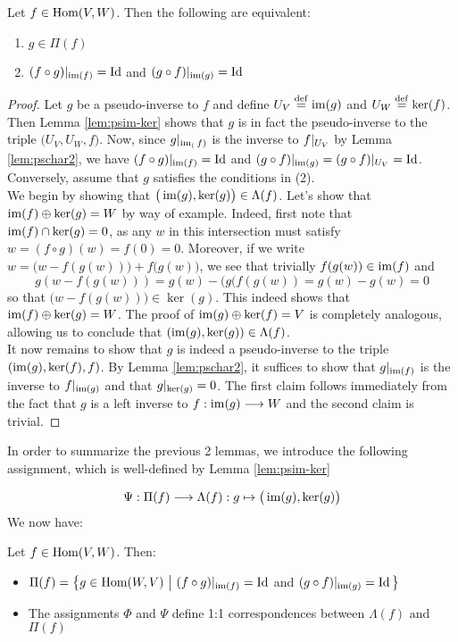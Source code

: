 \begin{lemma}\label{lem:charpi}
	Let $f \in \operatorname{Hom}(V,W)$. Then the following are equivalent:
	\begin{enumerate}
	\item $g \in \Pi(f)$
	\item $(f\circ g)\arrowvert_{\operatorname{im}(f)}=\operatorname{Id}$ and $(g\circ f)\arrowvert_{\operatorname{im}(g)}=\operatorname{Id}$ 
	\end{enumerate}
\end{lemma}

\begin{proof}
	Let $g$ be a pseudo-inverse to $f$ and define $U_V\stackrel{\operatorname{def}}{=}\operatorname{im}(g)$ and $U_W\stackrel{\operatorname{def}}{=}\ker(f)$. Then Lemma \ref{lem:psim-ker} shows that $g$ is in fact the pseudo-inverse to the triple $\big(U_V,U_W,f\big)$. Now, since $g\arrowvert_{\operatorname{im}_(f)}$ is the inverse to $f\arrowvert_{U_V}$ by Lemma \ref{lem:pschar2}, we have $(f \circ g)\arrowvert_{\operatorname{im}(f)}=\operatorname{Id}$ and $(g \circ f)\arrowvert_{\operatorname{im}(g)}=(g \circ f)\arrowvert_{U_V}=\operatorname{Id}$.\\
	Conversely, assume that $g$ satisfies the conditions in (2).\\
	We begin by showing that $\big(\operatorname{im}(g),\ker(g)\big) \in \Lambda(f)$. Let's show  that $\operatorname{im}(f)\oplus \ker(g)=W$ by way of example. Indeed, first note that $\operatorname{im}(f)\cap \ker(g)=0$, as any $w$ in this intersection must satisfy $w=(f\circ g)(w)=f(0)=0$. Moreover, if we write $w=\big(w-f( g(w))\big)+f ( g(w)\big)$, we see that trivially $f(g(w))\in \operatorname{im} (f)$ and \[
	g(w-f(g(w)))=g(w)-(g(f(g(w))=g(w)-g(w)=0
	\]
	so that $\big(w-f(g(w))\big) \in \ker(g)$. This indeed shows that $\operatorname{im}(f)\oplus \ker(g)=W$. The proof of $\operatorname{im}(g)\oplus \ker(f)=V$ is completely analogous, allowing us to conclude that $(\operatorname{im}(g),\ker(g))\in \Lambda(f)$.\\
	It now remains to show that $g$ is indeed a pseudo-inverse to the triple $(\operatorname{im}(g),\ker(f),f)$. By Lemma \ref{lem:pschar2}, it suffices to show that $g\arrowvert_{\operatorname{im}(f)}$ is the inverse to $f\arrowvert_{\operatorname{im}(g)}$ and that $g\arrowvert_{\ker(g)}=0$. The first claim follows immediately from the fact that $g$ is a left inverse to $f:\operatorname{im}(g)\longrightarrow W$ and the second claim is trivial.
\end{proof}

\noindent In order to summarize the previous 2 lemmas, we introduce the following assignment, which is well-defined by Lemma \ref{lem:psim-ker}

\[
\Psi: \Pi(f)\longrightarrow \Lambda(f): g\mapsto \big(\operatorname{im}(g),\ker(g)\big)
\]
We now have:
\begin{lemma}\label{lem:psinverses}
	Let $f \in \operatorname{Hom}(V,W)$. Then:
	\begin{itemize}
		\item 
		$\Pi(f)=\big\{ g \in \operatorname{Hom}(W,V)\,\,\big\vert\,\, (f\circ g)\arrowvert_{\operatorname{im}(f)}=\operatorname{Id}$ \textrm{ and } $(g\circ f)\arrowvert_{\operatorname{im}(g)}=\operatorname{Id} \big\} $
		\item The assignments $\Phi$ and $\Psi$ define 1:1 correspondences between $\Lambda(f)$ and $\Pi(f)$
	\end{itemize}
\end{lemma}



